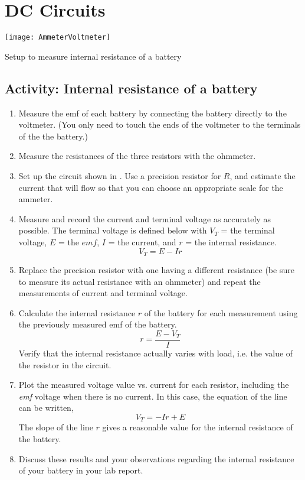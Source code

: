 \newpage
\section {DC Circuits}

\begin{marginfigure}
	\centering
	\texttt{[image: AmmeterVoltmeter]}%
	\caption{Setup to measure internal resistance of a battery}
	\label{f:vimtr}
\end{marginfigure}

\subsection{Activity: Internal resistance of a battery}
\begin{enumerate}
	\item Measure the emf of each battery by connecting the battery directly to the voltmeter. (You only need to touch the ends of the voltmeter to the terminals of the the battery.)
	\item Measure the resistances of the three resistors with the ohmmeter.
	\item Set up the circuit shown in .  Use a precision resistor for $R$, and estimate the current that will flow so that you can choose an appropriate scale for the ammeter.
	\item Measure and record the current and terminal voltage as accurately as possible. The terminal voltage is defined below with $V_T$ = the terminal voltage, $E$ = the $emf$, $I$ = the current, and $r$ = the internal resistance.
\begin{equation} \label{e:vterm}
	V_T  =  E -Ir 	%
\end{equation}
	\item Replace the precision resistor with one having a different resistance (be sure to measure its actual resistance with an ohmmeter) and repeat the measurements of current and terminal voltage.
	\item Calculate the internal resistance $r$ of the battery for each measurement using the previously measured emf of the battery. \[ r = \frac{E - V_T}{I} \]  Verify that the internal resistance actually varies with load, i.e. the value of the resistor in the circuit.
	\item Plot the measured voltage value vs. current for each resistor, including the \emph{emf} voltage when there is no current. In this case, the equation of the line can be written,
	\[ V_T  = -Ir + E \]
	The slope of the line $r$ gives a reasonable value for the internal resistance of the battery.
	\item Discuss these results and your observations regarding the internal resistance of your battery in your lab report.
\end{enumerate}


